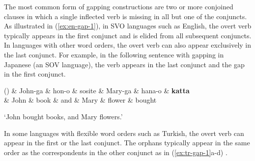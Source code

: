 \documentclass[lucida,biblatex]{sp} %
\newcounter{excounter}
\begin{document}
The most common form of gapping constructions are two or more conjoined clauses
in which a single inflected verb is missing in all but one of the conjuncts. As illustrated
in (\ref{ex:en-gap-1}), in SVO languages such as English, the overt verb typically 
appears in the first conjunct and is elided from all subsequent conjuncts. In languages 
with other word orders, the overt verb can also appear exclusively in the last conjunct.
For example, in the following sentence with gapping in Japanese (an SOV language), 
the verb appears  in the last conjunct and the gap in the first conjunct.

\begin{center}
  \label{ex:jp-gap-1}
  \footnotesize
  \begin{dependency}[edge unit distance=2.5ex]
    \begin{deptext}
     (\theexcounter)
     \& John-ga \& hon-o \& sosite  \& Mary-ga \& hana-o \& \textbf{katta} \\
     \& John  \& book \&  and \& Mary \& flower \& bought \\
    \end{deptext}
  \end{dependency}
  \trans `John bought books, and Mary flowers.' \\\normalsize \null \hfill \citep{Kato2006}
\end{center}

In some languages with flexible word orders such as Turkish, the overt verb can appear 
in the first or the last conjunct. The orphans typically appear in the same order as the 
correspondents in the other conjunct as in (\ref{ex:tr-gap-1}a-d) \citep{Bozsahin2000}.
\end{document}
